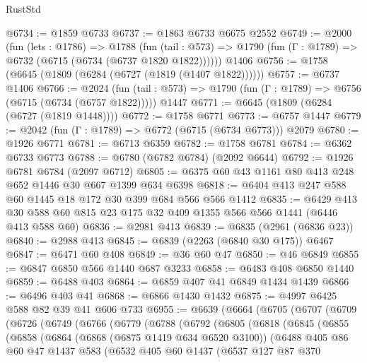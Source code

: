 \begin{lexlean}{RustStd}
\begin{coremodule}
@6734 := @1859 @6733
@6737 := @1863 @6733 @6675 @2552
@6749 := @2000
    (fun (lets : @1786) =>
    @1788
      (fun (tail : @573) => @1790 (fun (Γ : @1789) => @6732 (@6715 (@6734 (@6737 @1820 @1822))))))
    @1406
@6756 := @1758 (@6645 (@1809 (@6284 (@6727 (@1819 (@1407 @1822))))))
@6757 := @6737 @1406
@6766 := @2024
    (fun (tail : @573) => @1790 (fun (Γ : @1789) => @6756 (@6715 (@6734 (@6757 @1822)))))
    @1447
@6771 := @6645 (@1809 (@6284 (@6727 (@1819 @1448))))
@6772 := @1758 @6771
@6773 := @6757 @1447
@6779 := @2042 (fun (Γ : @1789) => @6772 (@6715 (@6734 @6773))) @2079
@6780 := @1926 @6771
@6781 := @6713 @6359
@6782 := @1758 @6781
@6784 := @6362 @6733 @6773
@6788 := @6780 (@6782 @6784) (@2092 @6644)
@6792 := @1926 @6781 @6784 (@2097 @6712)
@6805 := @6375 @60 @43 @1161 @80 @413 @248 @652 @1446 @30 @667 @1399 @634 @6398
@6818 := @6404 @413 @247 @588 @60 @1445 @18 @172 @30 @399 @684 @566 @566 @1412
@6835 := @6429 @413 @30 @588 @60 @815 @23 @175 @32 @409 @1355 @566 @566 @1441 (@6446 @413 @588 @60)
@6836 := @2981 @413
@6839 := @6835 (@2961 (@6836 @23))
@6840 := @2988 @413
@6845 := @6839 (@2263 (@6840 @30 @175)) @6467
@6847 := @6471 @60 @408
@6849 := @36 @60 @47
@6850 := @46 @6849
@6855 := @6847 @6850 @566 @1440 @687 @3233
@6858 := @6483 @408 @6850 @1440
@6859 := @6488 @403
@6864 := @6859 @407 @41 @6849 @1434 @1439
@6866 := @6496 @403 @41
@6868 := @6866 @1430 @1432
@6875 := @4997 @6425 @588 @82 @39 @41 @606 @733
@6955 := @6639
    (@6664
      (@6705
        (@6707
          (@6709
            (@6726
              (@6749
                (@6766
                  (@6779
                    (@6788
                      (@6792
                        (@6805
                          (@6818
                            (@6845
                              (@6855
                                (@6858
                                  (@6864
                                    (@6868 (@6875 @1419 @634 @6520 @3100))
                                    (@6488
                                      @405
                                      @86
                                      @60
                                      @47
                                      @1437
                                      @583
                                      (@6532
                                        @405
                                        @60
                                        @1437
                                        (@6537
                                          @127
                                          @87
                                          @370

\end{coremodule}
\end{lexlean}
